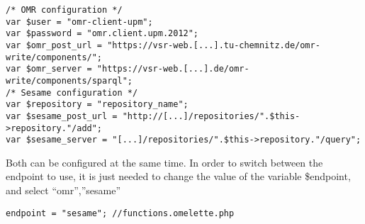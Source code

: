 \begin{lstlisting}[style=consola]
/* OMR configuration */
var $user = "omr-client-upm";
var $password = "omr.client.upm.2012";
var $omr_post_url = "https://vsr-web.[...].tu-chemnitz.de/omr-write/components/";
var $omr_server = "https://vsr-web.[...].de/omr-write/components/sparql";
/* Sesame configuration */
var $repository = "repository_name";
var $sesame_post_url = "http://[...]/repositories/".$this->repository."/add";
var $sesame_server = "[...]/repositories/".$this->repository."/query";

\end{lstlisting}

Both can be configured at the same time. In order to switch between the endpoint to use, it is
just needed to change the value of the variable \$endpoint, and select {“omr”,”sesame”}


\begin{lstlisting}[style=consola]
endpoint = "sesame"; //functions.omelette.php
\end{lstlisting}

